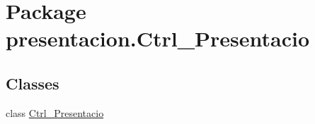 \hypertarget{namespacepresentacion_1_1Ctrl__Presentacio}{}\section{Package presentacion.\+Ctrl\+\_\+\+Presentacio}
\label{namespacepresentacion_1_1Ctrl__Presentacio}
\subsection*{Classes}
\begin{DoxyCompactItemize}
\item 
class \hyperlink{classpresentacion_1_1Ctrl__Presentacio_1_1Ctrl__Presentacio}{Ctrl\+\_\+\+Presentacio}
\end{DoxyCompactItemize}
